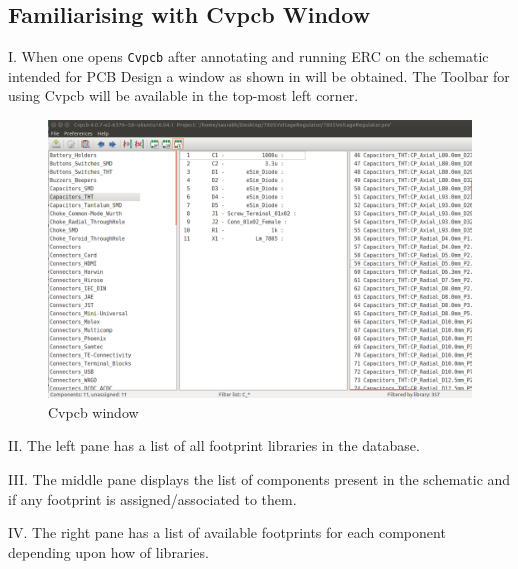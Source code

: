 \subsection{Familiarising with Cvpcb Window}
\begin{itemsize}
\item I. When one opens \texttt{Cvpcb} after annotating and running ERC on the schematic intended for PCB Design a window as shown in  will be obtained. The Toolbar for using Cvpcb will be available in the top-most left corner.
\begin{figure}
\centering
\includegraphics[width=\lgfig]{NGHDL/cvpcb_unassigned.png}
\caption{Cvpcb window}
\label{cvpcb}
\end{figure}
\item II. The left pane has a list of all footprint libraries in the database.
\item III. The middle pane displays the list of components present in the schematic and if any footprint is assigned/associated to them.
\item IV. The right pane has a list of available footprints for each component depending upon how of libraries.
\end{itemsize}



